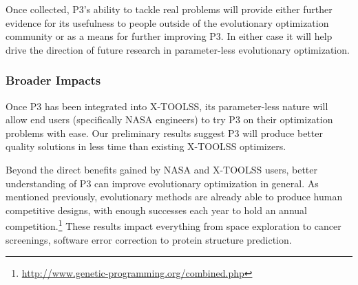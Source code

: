 \documentclass{article}
\begin{document}
Once collected, P3's ability to tackle real problems will provide either further evidence for its usefulness
to people outside of the evolutionary optimization community or as a means for further improving P3.
In either case it will help drive the direction of future research in parameter-less evolutionary optimization.


\subsubsection*{Broader Impacts}
Once P3 has been integrated into X-TOOLSS, its parameter-less nature will allow
end users (specifically NASA engineers) to try P3 on their optimization problems with ease.
Our preliminary results suggest P3 will produce better quality solutions in less time
than existing X-TOOLSS optimizers.

Beyond the direct benefits gained by NASA and X-TOOLSS users, better understanding of P3
can improve evolutionary optimization in general.  As mentioned previously, evolutionary
methods are already able to produce human competitive designs, with enough successes each
year to hold an annual competition.\footnote{\url{http://www.genetic-programming.org/combined.php}}
These results impact everything from space exploration to cancer screenings, software error correction
to protein structure prediction.


\newpage


\end{document}
